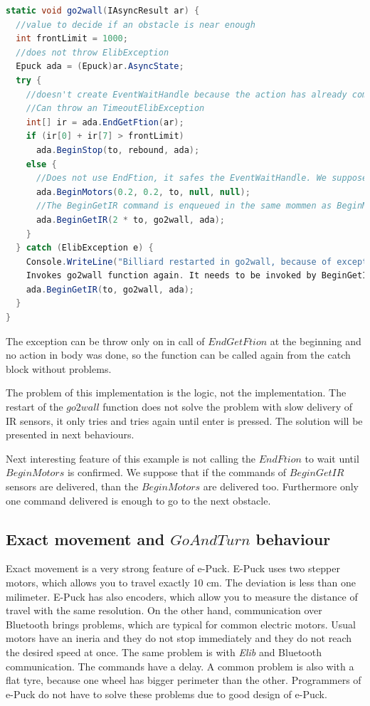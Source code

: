 \begin{lstlisting}[language=cs]
static void go2wall(IAsyncResult ar) {
  //value to decide if an obstacle is near enough
  int frontLimit = 1000;  
  //does not throw ElibException
  Epuck ada = (Epuck)ar.AsyncState;
  try {
    //doesn't create EventWaitHandle because the action has already completed synchronously.
    //Can throw an TimeoutElibException
    int[] ir = ada.EndGetFtion(ar);    
    if (ir[0] + ir[7] > frontLimit)
      ada.BeginStop(to, rebound, ada);
    else {
      //Does not use EndFtion, it safes the EventWaitHandle. We suppose, that it succeeds now or in next rounds.
      ada.BeginMotors(0.2, 0.2, to, null, null);
      //The BeginGetIR command is enqueued in the same mommen as BeginMotors, therefor 2*to.
      ada.BeginGetIR(2 * to, go2wall, ada);
    }
  } catch (ElibException e) {
    Console.WriteLine("Billiard restarted in go2wall, because of exception:\n" + e.Message);
    Invokes go2wall function again. It needs to be invoked by BeginGetIR command, because it expects ar with IR values.
    ada.BeginGetIR(to, go2wall, ada);
  }
}
\end{lstlisting}
  The exception can be throw only on in call of $EndGetFtion$ at the beginning and 
  no action in body was done, so the function can be called again from the catch block without problems.

  The problem of this implementation is the logic, not the implementation. 
  The restart of the $go2wall$ function does not solve the problem with 
  slow delivery of IR sensors, it only tries and tries again until enter is pressed.
  The solution will be presented in next behaviours.

  Next interesting feature of this example is not calling the $EndFtion$ to wait until $BeginMotors$ is confirmed.
  We suppose that if the commands of $BeginGetIR$ sensors are delivered, than the $BeginMotors$ are delivered too.
  Furthermore only one command delivered is enough to go to the next obstacle.

\subsection{Exact movement and $GoAndTurn$ behaviour} \label{sec:go}
  Exact movement is a very strong feature of e-Puck. E-Puck uses two stepper motors,
  which allows you to travel exactly 10 cm. The deviation is less than one milimeter.
  E-Puck has also encoders, which allow you to measure the distance of travel with the same resolution.
  On the other hand, communication over Bluetooth brings problems, which are typical for common electric motors.
  Usual motors have an ineria and they do not stop immediately and they do not reach the desired speed at once. The same problem is with 
  {\it Elib} and Bluetooth communication. The commands have a delay.
  A common problem is also with a flat tyre, because one wheel has bigger perimeter than the other.
  Programmers of e-Puck do not have to solve these problems due to good design of e-Puck.

